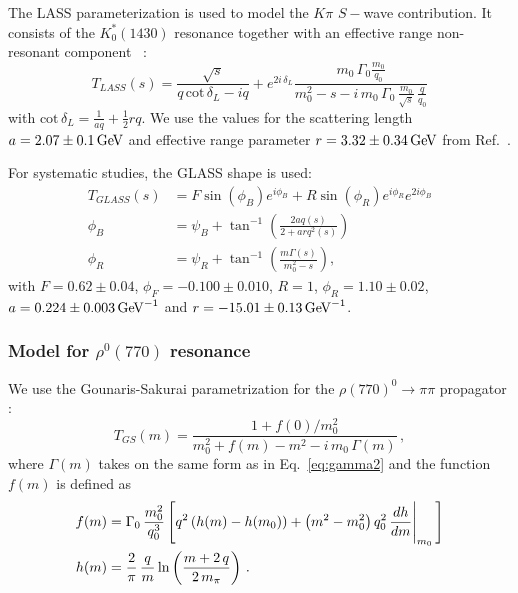 The {LASS} parameterization is used to model the $K\pi$ $S-$wave contribution.
It consists of the $K_0^*(1430)$ resonance together with an effective range non-resonant component ~\cite{Lass,Aston:1987ir,Aubert:2005ce}:
	\begin{equation}
			T_{LASS}(s) = 
			\frac{\sqrt s}{q \, \text{cot}\, \delta_L- i q}   
			+ e^{2i \, \delta_L} \frac{m_0 \, \Gamma_0 \frac{m_0}{q_0}}{m_0^{2} - s - i\,m_{0}\,\Gamma_{0} \, \frac{m_{0}}{\sqrt s} \, \frac{q}{q_{0}}} 
	\label{eq:Lass}
	\end{equation}
	with $\text{cot}\, \delta_L = \frac{1}{aq} + \frac{1}{2} rq$.
	We use the values for the scattering length $a = 2.07 \pm 0.1 \mathrm{\,Ge\kern -0.1em V}$ and effective range parameter $r=3.32\pm0.34 \mathrm{\,Ge\kern -0.1em V}$ from Ref.~\cite{Lass,Aston:1987ir}.

       For systematic studies, the GLASS shape is used:
	\begin{align}
			T_{GLASS}(s) &= 
			F \sin(\phi_B) e^{i\phi_B}   + R \sin(\phi_R) e^{i\phi_R} e^{2i\phi_B}    \\
			\phi_B &= \psi_B + \tan^{-1}\left(\frac{2aq(s)}{2+arq^2(s)}\right)   \\
			\phi_R &= \psi_R + \tan^{-1}\left(\frac{m\Gamma(s)}{m_0^2-s}\right)  ,
	\label{eq:Lass}
	\end{align}
	with $F=0.62\pm0.04$, $\phi_F = -0.100\pm 0.010$, $R=1$, $\phi_R=1.10\pm0.02$, $a=0.224\pm0.003 \mathrm{\,Ge\kern -0.1em V}^{-1}$
	and $r=-15.01\pm0.13 \mathrm{\,Ge\kern -0.1em V}^{-1}$.


\subsubsection*{Model for $\rho^0(770)$ resonance}

	We use the Gounaris-Sakurai parametrization for the $\rho(770)^{0} \to \pi \pi$ propagator \cite{GS}:
\begin{equation}
    T_{GS}(m) = \frac{1+ f(0)/ m_{0}^{2}  }
	{m_{0}^{2}+f(m)-m^{2}-i\,m_{0}\,\Gamma(m)}  \, ,
\end{equation}
where $\Gamma(m)$ takes on the same form as in Eq.~\ref{eq:gamma2} 
and the function $f(m)$ is defined as
\begin{align}
	f(m) &= \Gamma_{0} \, \frac{m_{0}^{2}}{q_{0}^{3}} \left[   
	q^{2} \left( h(m) - h(m_{0}) \right) + \left(m^{2}-m_{0}^{2}\right) q_{0}^{2} \, \frac{dh}{dm} \Bigg{\vert}_{m_{0}}
	\, \right]  \\
	h(m) &= \frac{2}{\pi} \, \frac{q}{m} \,  \text{ln} \left( \frac{m+2\,q}{2 \, m_{\pi}}
	\right)     \, .
\end{align}

